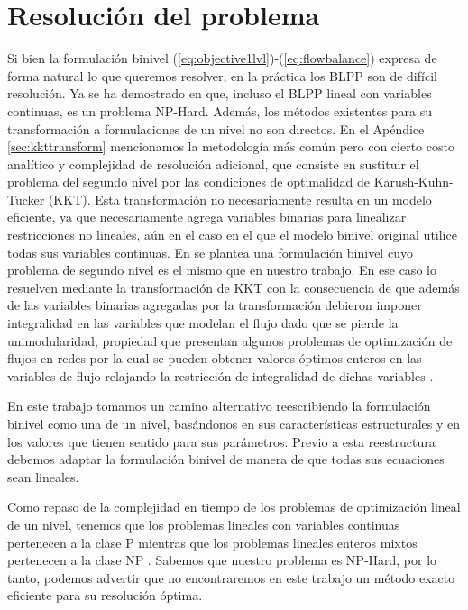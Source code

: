 \chapter{Resolución del problema}
\label{sect:problemresolution}

Si bien la formulación binivel (\ref{eq:objective1lvl})-(\ref{eq:flowbalance}) expresa de forma natural lo que queremos resolver, en la práctica los BLPP son de difícil resolución. Ya se ha demostrado en \parencite{bardbook} que, incluso el BLPP lineal con variables continuas, es un problema NP-Hard. Además, los métodos existentes para su transformación a formulaciones de un nivel no son directos. En el Apéndice \ref{sec:kkttransform} mencionamos la metodología más común pero con cierto costo analítico y complejidad de resolución adicional, que consiste en sustituir el problema del segundo nivel por las condiciones de optimalidad de Karush-Kuhn-Tucker (KKT). Esta transformación no necesariamente resulta en un modelo eficiente, ya que necesariamente agrega variables binarias para linealizar restricciones no lineales, aún en el caso en el que el modelo binivel original utilice todas sus variables continuas. En \parencite{kara2004} se plantea una formulación binivel cuyo problema de segundo nivel es el mismo que en nuestro trabajo. En ese caso lo resuelven mediante la transformación de KKT con la consecuencia de que además de las variables binarias agregadas por la transformación debieron imponer integralidad en las variables que modelan el flujo dado que se pierde la unimodularidad, propiedad que presentan algunos problemas de optimización de flujos en redes por la cual se pueden obtener valores óptimos enteros en las variables de flujo relajando la restricción de integralidad de dichas variables \parencite{shrijver1986}.

En este trabajo tomamos un camino alternativo reescribiendo la formulación binivel como una de un nivel, basándonos en sus características estructurales y en los valores que tienen sentido para sus parámetros. Previo a esta reestructura debemos adaptar la formulación binivel de manera de que todas sus ecuaciones sean lineales.

Como repaso de la complejidad en tiempo de los problemas de optimización lineal de un nivel, tenemos que los problemas lineales con variables continuas pertenecen a la clase P mientras que los problemas lineales enteros mixtos pertenecen a la clase NP \parencite{dimitris1998}. Sabemos que nuestro problema es NP-Hard, por lo tanto, podemos advertir que no encontraremos en este trabajo un método exacto eficiente para su resolución óptima.

